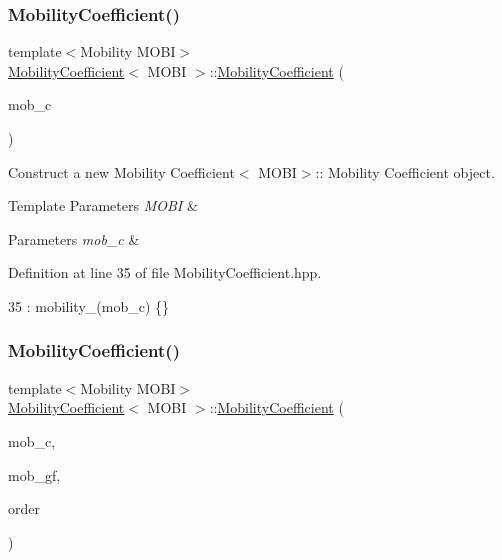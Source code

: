 \subsubsection{\texorpdfstring{Mobility\+Coefficient()}{MobilityCoefficient()}\hspace{0.1cm}{\footnotesize\ttfamily [1/2]}}
{\footnotesize\ttfamily template$<$Mobility M\+O\+BI$>$ \\
\hyperlink{classMobilityCoefficient}{Mobility\+Coefficient}$<$ M\+O\+BI $>$\+::\hyperlink{classMobilityCoefficient}{Mobility\+Coefficient} (\begin{DoxyParamCaption}\item[{const double \&}]{mob\+\_\+c }\end{DoxyParamCaption})\hspace{0.3cm}{\ttfamily [explicit]}}



Construct a new Mobility Coefficient$<$ M\+O\+B\+I$>$\+:\+: Mobility Coefficient object. 


\begin{DoxyTemplParams}{Template Parameters}
{\em M\+O\+BI} & \\
\hline
\end{DoxyTemplParams}

\begin{DoxyParams}{Parameters}
{\em mob\+\_\+c} & \\
\hline
\end{DoxyParams}


Definition at line 35 of file Mobility\+Coefficient.\+hpp.


\begin{DoxyCode}
35 : mobility\_(mob\_c) \{\}
\end{DoxyCode}
\mbox{\label{classMobilityCoefficient_a12dab2f5b95a5ab5f6cb01c2d2b5c65c}} 
\subsubsection{\texorpdfstring{Mobility\+Coefficient()}{MobilityCoefficient()}\hspace{0.1cm}{\footnotesize\ttfamily [2/2]}}
{\footnotesize\ttfamily template$<$Mobility M\+O\+BI$>$ \\
\hyperlink{classMobilityCoefficient}{Mobility\+Coefficient}$<$ M\+O\+BI $>$\+::\hyperlink{classMobilityCoefficient}{Mobility\+Coefficient} (\begin{DoxyParamCaption}\item[{const double \&}]{mob\+\_\+c,  }\item[{mfem\+::\+Grid\+Function}]{mob\+\_\+gf,  }\item[{const int \&}]{order }\end{DoxyParamCaption})}



